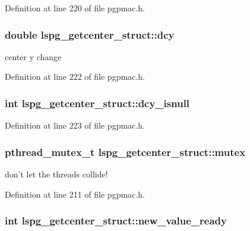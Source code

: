 Definition at line 220 of file pgpmac.\-h.

\hypertarget{structlspg__getcenter__struct_a55b1a488b714e6a40d8e06a6e182bd0a}{
\subsubsection[{dcy}]{\setlength{\rightskip}{0pt plus 5cm}double lspg\-\_\-getcenter\-\_\-struct\-::dcy}}\label{structlspg__getcenter__struct_a55b1a488b714e6a40d8e06a6e182bd0a}


center y change 



Definition at line 222 of file pgpmac.\-h.

\hypertarget{structlspg__getcenter__struct_a352c48c8d443c52f18ebd13019d01684}{
\subsubsection[{dcy\-\_\-isnull}]{\setlength{\rightskip}{0pt plus 5cm}int lspg\-\_\-getcenter\-\_\-struct\-::dcy\-\_\-isnull}}\label{structlspg__getcenter__struct_a352c48c8d443c52f18ebd13019d01684}


Definition at line 223 of file pgpmac.\-h.

\hypertarget{structlspg__getcenter__struct_a214bb7e88b137162f13f41f2c43002a9}{
\subsubsection[{mutex}]{\setlength{\rightskip}{0pt plus 5cm}pthread\-\_\-mutex\-\_\-t lspg\-\_\-getcenter\-\_\-struct\-::mutex}}\label{structlspg__getcenter__struct_a214bb7e88b137162f13f41f2c43002a9}


don't let the threads collide! 



Definition at line 211 of file pgpmac.\-h.

\hypertarget{structlspg__getcenter__struct_a4b350f11f1e375b9e9e839caaffbcb6b}{
\subsubsection[{new\-\_\-value\-\_\-ready}]{\setlength{\rightskip}{0pt plus 5cm}int lspg\-\_\-getcenter\-\_\-struct\-::new\-\_\-value\-\_\-ready}}\label{structlspg__getcenter__struct_a4b350f11f1e375b9e9e839caaffbcb6b}


